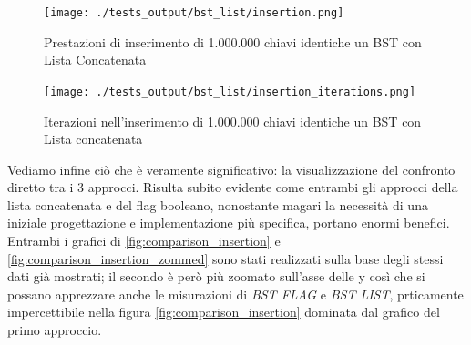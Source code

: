 \documentclass{article}
\begin{document}
\begin{figure}[htbp]
 \begin{minipage}{0.5\textwidth}
    \centering
    \texttt{[image: ./tests\_output/bst\_list/insertion.png]}
    \caption{Prestazioni di inserimento di 1.000.000 chiavi identiche un BST con Lista Concatenata}
    \label{fig:bst-list-insetion}
  \end{minipage}
      \hspace{0.05\textwidth}
  \begin{minipage}{0.5\textwidth}
    \centering
    \texttt{[image: ./tests\_output/bst\_list/insertion\_iterations.png]}
    \caption{Iterazioni nell'inserimento di 1.000.000 chiavi identiche un BST con Lista concatenata}
    \label{fig:bst-list-insetion-iterations}
  \end{minipage}%
\end{figure}



\begin{minipage}[t]{\linewidth}
\begin{multicols}{2}
\begin{minipage}{\linewidth}
    \centering
    \label{tab:bst-flag-insertion-summarised}
\end{minipage}

\columnbreak

\begin{minipage}{\linewidth}
    \centering
    \label{tab:bst-list-insertion-summarised}
\end{minipage}

\end{multicols}

\end{minipage}

\vspace{10px}

Vediamo infine ciò che è veramente significativo: la visualizzazione del confronto diretto tra i 3 approcci.
Risulta subito evidente come entrambi gli approcci della lista concatenata e del flag booleano, nonostante magari la necessità di una iniziale progettazione e implementazione più specifica, portano enormi benefici. Entrambi i grafici di  {\cref{fig:comparison_insertion}} e {\cref{fig:comparison_insertion_zommed}} sono stati realizzati sulla base degli stessi dati già mostrati; il secondo è però più zoomato sull'asse delle y  così che si possano apprezzare anche le misurazioni di \textit{BST FLAG} e \textit{BST LIST}, prticamente impercettibile nella figura {\cref{fig:comparison_insertion}} dominata dal grafico del primo approccio.
\end{document}
